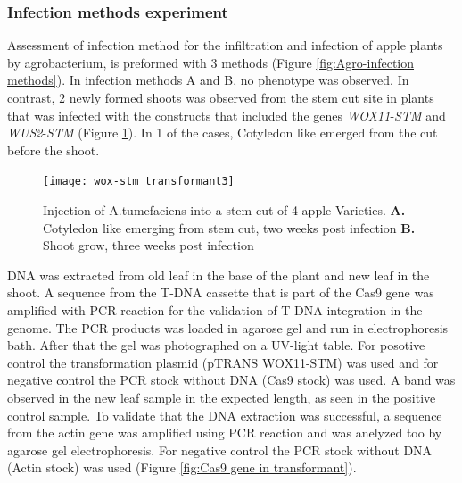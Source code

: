 \documentclass[
]{article}
\begin{document}
\hypertarget{infection-methods-experiment-1}{%
\subsubsection{Infection methods
experiment}\label{infection-methods-experiment-1}}

Assessment of infection method for the infiltration and infection of
apple plants by agrobacterium, is preformed with 3 methods (Figure
\ref{fig:Agro-infection methods}). In infection methods A and B, no
phenotype was observed. In contrast, 2 newly formed shoots was observed
from the stem cut site in plants that was infected with the constructs
that included the genes \emph{WOX11}-\emph{STM} and
\emph{WUS2}-\emph{STM} (Figure \ref{fig:wox-stm transformant}). In 1 of
the cases, Cotyledon like emerged from the cut before the shoot.

\begin{figure}[h]

{\centering \texttt{[image: wox-stm transformant3]} 

}

\caption{Injection of A.tumefaciens into a stem cut of 4 apple Varieties. \newline{} \textbf{A.} Cotyledon like emerging from stem cut, two weeks post infection \textbf{B.} Shoot grow, three weeks post infection}\label{fig:wox-stm transformant}
\end{figure}

DNA was extracted from old leaf in the base of the plant and new leaf in
the shoot. A sequence from the T-DNA cassette that is part of the Cas9
gene was amplified with PCR reaction for the validation of T-DNA
integration in the genome. The PCR products was loaded in agarose gel
and run in electrophoresis bath. After that the gel was photographed on
a UV-light table. For posotive control the transformation plasmid
(pTRANS WOX11-STM) was used and for negative control the PCR stock
without DNA (Cas9 stock) was used. A band was observed in the new leaf
sample in the expected length, as seen in the positive control sample.
To validate that the DNA extraction was successful, a sequence from the
actin gene was amplified using PCR reaction and was anelyzed too by
agarose gel electrophoresis. For negative control the PCR stock without
DNA (Actin stock) was used (Figure \ref{fig:Cas9 gene in transformant}).
\end{document}
